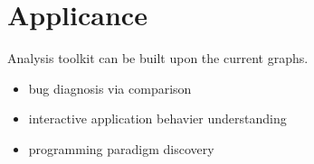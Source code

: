 \section {Applicance}
Analysis toolkit can be built upon the current graphs.
\begin {itemize}
\item bug diagnosis via comparison
\item interactive application behavier understanding
\item programming paradigm discovery
\end {itemize}
